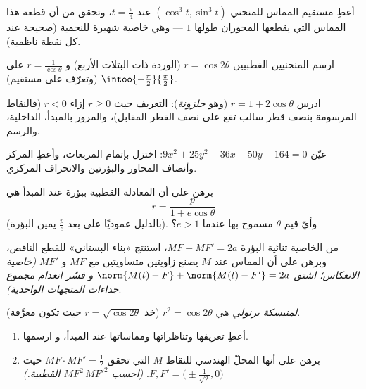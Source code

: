 \begin{exercise}[$\star$]\label{exo:b1:curves:3}
أعطِ مستقيم المماس للمنحني $(\cos^3 t, \sin^3 t)$ عند $t =
\frac\pi4$، وتحقق من أن قطعة هذا المماس التي يقطعها
المحوران طولها $1$ --- وهي خاصية شهيرة للنجمية (صحيحة عند
كل نقطة ناظمية).
\end{exercise}

\begin{exercise}[$\star$]\label{exo:b1:curves:4}
ارسم المنحنيين القطبيين $r = \cos 2\theta$ (الوردة ذات البتلات الأربع) و
$r = \frac{1}{\cos\theta}$ على $\intoo{-\frac\pi2}{\frac\pi2}$
(وتعرّف على مستقيم).
\end{exercise}

\begin{exercise}[$\star\star$]\label{exo:b1:curves:5}
ادرس  $r = 1 + 2\cos\theta$ (وهو \emph{حلزونة}):  التعريف
حيث $r \geq 0$ إزاء $r < 0$ (فالنقاط المرسومة بنصف قطر سالب
تقع على نصف القطر المقابل)، والمرور بالمبدأ،  الداخلية،
والرسم.
\end{exercise}

\begin{exercise}[$\star\star$]\label{exo:b1:curves:6}
عيّن  $9x^2 + 25y^2 - 36x - 50y - 164 = 0$: اختزل بإتمام
المربعات، وأعطِ المركز وأنصاف المحاور والبؤرتين والانحراف المركزي.
\end{exercise}

\begin{exercise}[$\star\star$]\label{exo:b1:curves:7}
برهن على أن المعادلة القطبية  ببؤرة عند المبدأ
هي
\[
r = \frac{p}{1 + e\cos\theta}
\]
(بالدليل عموديًا على بعد $\frac pe$ يمين البؤرة).
وأيّ قيم $\theta$ مسموح بها عندما $e > 1$؟
\end{exercise}

\begin{exercise}[$\star\star$]\label{exo:b1:curves:8}
من الخاصية ثنائية البؤرة $MF + MF' = 2a$، استنتج «بناء
البستاني» للقطع الناقص، وبرهن على أن المماس عند $M$
يصنع زاويتين متساويتين مع $MF$ و $MF'$ \emph{(خاصية الانعكاس؛
اشتق $\norm{M(t) - F} + \norm{M(t) - F'} = 2a$ و
فسّر انعدام مجموع جداءات المتجهات الواحدية)}.
\end{exercise}

\begin{exercise}[$\star\star\star$]\label{exo:b1:curves:9}
\emph{لمنيسكة برنولي} هي  $r^2 = \cos
2\theta$ (خذ $r = \sqrt{\cos2\theta}$ حيث تكون معرَّفة).
\begin{enumerate}
  \item أعطِ  تعريفها وتناظراتها ومماساتها عند المبدأ، و
        ارسمها.
  \item برهن على أنها المحلّ الهندسي للنقاط $M$ التي تحقق $MF \cdot MF'
        = \frac12$ حيث $F, F' = \bigl(\pm\frac{1}{\sqrt2},
        0\bigr)$. \emph{(احسب $MF^2\,MF'^2$ 
        القطبية.)}
\end{enumerate}
\end{exercise}

